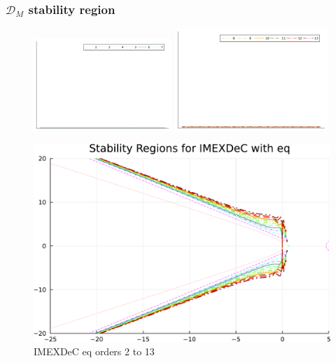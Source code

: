 \subsubsection*{$\mathcal{D}_M$ stability region}
\begin{figure}
	\centering
	\includegraphics[width=0.465\textwidth,trim={215 340 32 22}, clip]{pdf/odepics/colors_a-d_new_horiz_2-7_no_order.pdf}\!\!
	\includegraphics[width=0.515\textwidth,trim={178 340 30 22}, clip]{pdf/odepics/colors_a-d_new_horiz_8-13_no_order.pdf}\\
	\begin{minipage}[t]{0.32\textwidth}
		\centering
		\includegraphics[width=\textwidth, trim={0 0 0 22}, clip]{pdf/odepics/Minion_IMEXDeC_eq_ord13-crop.pdf}
		IMEXDeC eq orders 2 to 13
	\end{minipage}	
	\begin{minipage}[t]{0.32\textwidth}

\end{minipage}
\end{figure}

